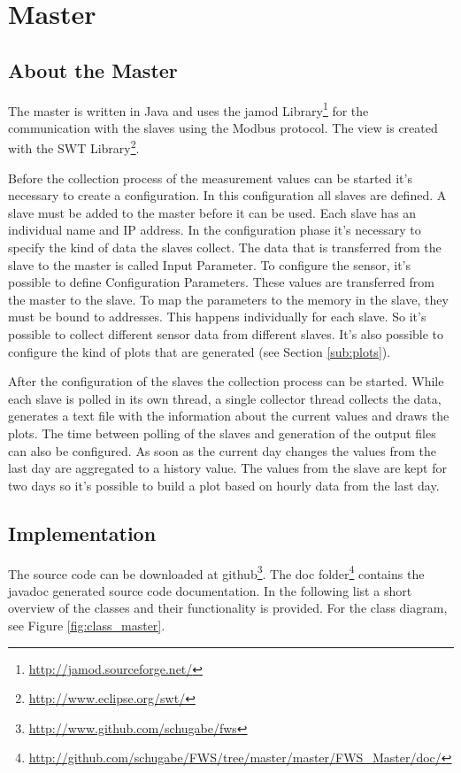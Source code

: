 
\chapter{Master}

\section{About the Master} %
\label{sec:about_the_master}
The master is written in Java and uses the jamod Library\footnote{\url{http://jamod.sourceforge.net/}} for the communication with the slaves using the Modbus protocol. The view is created with the SWT Library\footnote{\url{http://www.eclipse.org/swt/}}. 

Before the collection process of the measurement values can be started it's necessary to create a configuration. In this configuration all slaves are defined. A slave must be added to the master before it can be used. Each slave has an individual name and IP address. In the configuration phase it's necessary to specify the kind of data the slaves collect. The data that is transferred from the slave to the master is called Input Parameter. To configure the sensor, it's possible to define Configuration Parameters. These values are transferred from the master to the slave. To map the parameters to the memory in the slave, they must be bound to addresses. This happens individually for each slave. So it's possible to collect different sensor data from different slaves. It's also possible to configure the kind of plots that are generated (see Section \ref{sub:plots}).

After the configuration of the slaves the collection process can be started. While each slave is polled in its own thread, a single collector thread collects the data, generates a text file with the information about the current values and draws the plots. The time between polling of the slaves and generation of the output files can also be configured. As soon as the current day changes the values from the last day are aggregated to a history value. The values from the slave are kept for two days so it's possible to build a plot based on hourly data from the last day. 

\section{Implementation} %
\label{sec:implementation}
The source code can be downloaded at github\footnote{\url{http://www.github.com/schugabe/fws}}. The doc folder\footnote{\url{http://github.com/schugabe/FWS/tree/master/master/FWS_Master/doc/}} contains the javadoc generated source code documentation. In the following list a short overview of the classes and their functionality is provided. For the class diagram, see Figure \ref{fig:class_master}.

